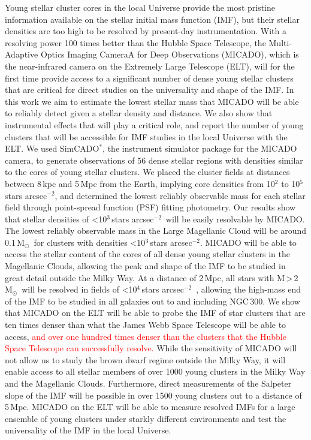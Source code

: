 \documentclass{aa}
\newcommand{\msun}{M$_\odot$~}
\newcommand{\h}[1]{$^{#1}$}
\newcommand{\spa}{stars arcsec$^{-2}$~}
\newcommand{\spae}{stars arcsec$^{-2}$}
\newcommand{\langedit}[1]{\textcolor{red}{#1}}
\begin{document}
  \abstract
{Young stellar cluster cores in the local Universe provide the most pristine information available on the stellar initial mass function (IMF), but their stellar densities are too high to be resolved by present-day instrumentation.
With a resolving power 100 times better than the Hubble Space Telescope, the Multi-Adaptive Optics Imaging CameraA for Deep Observations (MICADO), which is the near-infrared camera on the Extremely Large Telescope (ELT), will for the first time provide access to a significant number of dense young stellar clusters that are critical for direct studies on the universality and shape of the IMF.}
{In this work we aim to estimate the lowest stellar mass that MICADO will be able to reliably detect given a stellar density and distance.
We also show that instrumental effects that will play a critical role, and report the number of young clusters that will be accessible for IMF studies in the local Universe with the ELT.}
{We used SimCADO$^*$, the instrument simulator package for the MICADO camera, to generate observations of 56 dense stellar regions with densities similar to the cores of young stellar clusters.
We placed the cluster fields at distances between 8\,kpc and 5\,Mpc from the Earth, implying core densities from 10\h2 to 10\h5\,\spae, and determined the lowest reliably observable mass for each stellar field through point-spread function (PSF) fitting photometry.}
{Our results show that stellar densities of \textless10\h3\,\spa will be easily resolvable by MICADO. The lowest reliably observable mass in the Large Magellanic Cloud will be around 0.1\,\msun for clusters with densities \textless10\h3\,\spae.
MICADO will be able to access the stellar content of the cores of all dense young stellar clusters in the Magellanic Clouds, allowing the peak and shape of the IMF to be studied in great detail outside the Milky Way.
At a distance of 2\,Mpc, all stars with M\,\textgreater\,2\,\msun will be resolved in fields of \textless10\h4\,\spa, allowing the high-mass end of the IMF to be studied in all galaxies out to and including NGC\,300.}
{We show that MICADO on the ELT will be able to probe the IMF of star clusters that are ten times denser than what the James Webb Space Telescope will be able to access,
\langedit{and over one hundred times denser than the clusters that the Hubble Space Telescope can successfully resolve.}
While the sensitivity of MICADO will not allow us to study the brown dwarf regime outside the Milky Way, it will enable access to all stellar members of over 1000 young clusters in the Milky Way and the Magellanic Clouds.
Furthermore, direct measurements of the Salpeter slope of the IMF will be possible in over 1500 young clusters out to a distance of 5\,Mpc.
MICADO on the ELT will be able to measure resolved IMFs for a large ensemble of young clusters under starkly different environments and test the universality of the IMF in the local Universe.}
\end{document}
